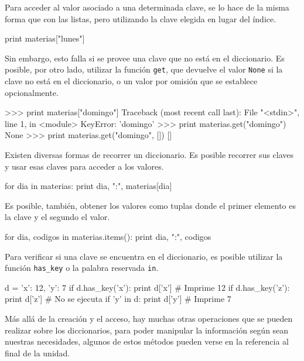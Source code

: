 Para acceder al valor asociado a una determinada clave, se lo hace
de la misma forma que con las listas, pero utilizando la clave
elegida en lugar del índice.

\begin{codigo-python-sn}
print materias["lunes"]
\end{codigo-python-sn}

Sin embargo, esto falla si se provee una clave que no está en el diccionario.
Es posible, por otro lado, utilizar la función \lstinline{get}, que devuelve el
valor \lstinline{None} si la clave no está en el diccionario, o un valor por
omisión que se establece opcionalmente.

\begin{codigo-python-sn}
>>> print materias["domingo"]
Traceback (most recent call last):
  File "<stdin>", line 1, in <module>
KeyError: 'domingo'
>>> print materias.get("domingo")
None
>>> print materias.get("domingo", [])
[]
\end{codigo-python-sn}

Existen diversas formas de recorrer un diccionario.  Es posible recorrer
sus claves y usar esas claves para acceder a los valores.

\begin{codigo-python-sn}
for dia in materias:
    print dia, ":", materias[dia]
\end{codigo-python-sn}

Es posible, también, obtener los valores como tuplas donde el primer
elemento es la clave y el segundo el valor.

\begin{codigo-python-sn}
for dia, codigos in materias.items():
    print dia, ":", codigos
\end{codigo-python-sn}

Para verificar si una clave se encuentra en el diccionario, es posible
utilizar la función \lstinline{has_key} o la palabra reservada
\lstinline{in}.

\begin{codigo-python-sn}
d = {'x': 12, 'y': 7}
if d.has_key('x'):
    print d['x']   # Imprime 12
if d.has_key('z'):
    print d['z']   # No se ejecuta
if 'y' in d:
    print d['y']   # Imprime 7
\end{codigo-python-sn}

Más allá de la creación y el acceso, hay muchas otras operaciones que se
pueden realizar sobre los diccionarios, para poder manipular la información
según sean nuestras necesidades, algunos de estos métodos pueden verse en
la referencia al final de la unidad.

